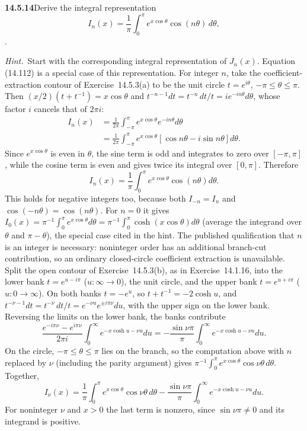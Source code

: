 \par\bigskip
\noindent\textbf{14.5.14}\quad Derive the integral representation
\[
I_{n}(x)=\frac{1}{\pi}\int_{0}^{\pi}e^{x\cos\theta}
\cos(n\theta)\,d\theta,
\]
.
\par\emph{Hint.}~Start with the corresponding integral representation
of $J_{n}(x)$. Equation (14.112) is a special case of this
representation.
\solution
For integer $n$, take the coefficient-extraction contour of
Exercise~14.5.3(a) to be the unit circle $t=e^{i\theta}$,
$-\pi\le\theta\le\pi$. Then $(x/2)(t+t^{-1})=x\cos\theta$ and
$t^{-n-1}dt=t^{-n}\,dt/t=ie^{-in\theta}d\theta$, whose factor $i$
cancels that of $2\pi i$:
\begin{align*}
I_n(x)
&=\frac1{2\pi}\int_{-\pi}^{\pi}
e^{x\cos\theta}e^{-in\theta}d\theta\\
&=\frac1{2\pi}\int_{-\pi}^{\pi}
e^{x\cos\theta}[\cos n\theta-i\sin n\theta]d\theta.
\end{align*}
Since $e^{x\cos\theta}$ is even in $\theta$, the sine term is odd
and integrates to zero over $[-\pi,\pi]$, while the cosine term is
even and gives twice its integral over $[0,\pi]$. Therefore
\[
\boxed{I_n(x)=\frac1\pi\int_0^\pi
e^{x\cos\theta}\cos(n\theta)d\theta}.
\]
This holds for negative integers too, because both $I_{-n}=I_n$
and $\cos(-n\theta)=\cos(n\theta)$. For $n=0$ it gives
$I_0(x)=\pi^{-1}\int_0^\pi e^{x\cos\theta}d\theta
=\pi^{-1}\int_0^\pi\cosh(x\cos\theta)d\theta$ (average the
integrand over $\theta$ and $\pi-\theta$), the special case cited
in the hint.
The published qualification that $n$ is an integer is necessary:
noninteger order has an additional branch-cut contribution, so
an ordinary closed-circle coefficient extraction is unavailable.
Split the open contour of Exercise~14.5.3(b), as in
Exercise~14.1.16, into the lower bank $t=e^{u-i\pi}$
($u:\infty\to0$), the unit circle, and the upper bank
$t=e^{u+i\pi}$ ($u:0\to\infty$). On both banks $t=-e^u$, so
$t+t^{-1}=-2\cosh u$, and $t^{-\nu-1}dt=t^{-\nu}\,dt/t
=e^{-\nu u}e^{\pm i\pi\nu}du$, with the upper sign on the lower
bank. Reversing the limits on the lower bank, the banks contribute
\[
\frac{e^{-i\pi\nu}-e^{i\pi\nu}}{2\pi i}
\int_0^\infty e^{-x\cosh u-\nu u}du
=-\frac{\sin\nu\pi}{\pi}\int_0^\infty e^{-x\cosh u-\nu u}du.
\]
On the circle, $-\pi\le\theta\le\pi$ lies on the branch, so the
computation above with $n$ replaced by $\nu$ (including the parity
argument) gives
$\pi^{-1}\int_0^\pi e^{x\cos\theta}\cos\nu\theta\,d\theta$.
Together,
\[
I_\nu(x)=\frac1\pi\int_0^\pi e^{x\cos\theta}\cos\nu\theta\,d\theta
-\frac{\sin\nu\pi}\pi\int_0^\infty e^{-x\cosh u-\nu u}du.
\]
For noninteger $\nu$ and $x>0$ the last term is nonzero, since
$\sin\nu\pi\ne0$ and its integrand is positive.

